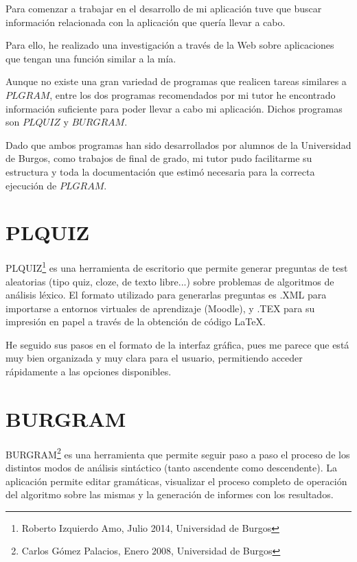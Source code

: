 
Para comenzar a trabajar en el desarrollo de mi aplicación tuve que buscar información relacionada con la aplicación que quería llevar a cabo.

Para ello, he realizado una investigación a través de la Web sobre  aplicaciones que tengan una función similar a la mía. 

Aunque no existe una gran variedad de programas que realicen tareas similares a $PLGRAM$, entre los dos programas recomendados por mi tutor he encontrado información suficiente para poder llevar a cabo mi aplicación. Dichos programas son $PLQUIZ$ y $BURGRAM$.

Dado que ambos programas han sido desarrollados por alumnos de la Universidad de Burgos, como trabajos de final de grado, mi tutor pudo facilitarme su estructura y toda la documentación que estimó necesaria para la correcta ejecución de $ PLGRAM $.


\section{PLQUIZ}

PLQUIZ\footnote{Roberto Izquierdo Amo, Julio 2014, Universidad de Burgos} es una herramienta de escritorio que permite generar preguntas de test aleatorias (tipo quiz, cloze, de texto libre...) sobre problemas de algoritmos de análisis léxico. El formato utilizado para generarlas preguntas es .XML para importarse a entornos virtuales de aprendizaje (Moodle), y .TEX para  su impresión en papel a través de la obtención de código \LaTeX{}.

He seguido sus pasos en el formato de la interfaz gráfica, pues me parece que está muy bien organizada y muy clara para el usuario, permitiendo acceder rápidamente a las opciones disponibles.



\section{BURGRAM}

BURGRAM\footnote{Carlos Gómez Palacios, Enero 2008, Universidad de Burgos} es una herramienta que permite seguir paso a paso el proceso de los distintos modos de análisis sintáctico (tanto ascendente como descendente). La aplicación permite editar gramáticas, visualizar el proceso completo de operación del algoritmo sobre las mismas y la generación de informes con los resultados.

